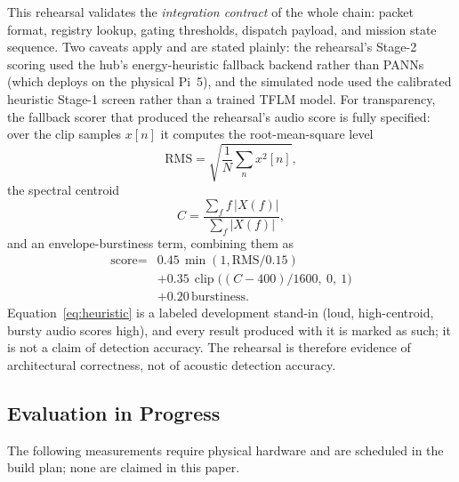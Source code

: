 \documentclass[journal]{IEEEtran}
\begin{document}
This rehearsal validates the \emph{integration contract} of the whole chain:
packet format, registry lookup, gating thresholds, dispatch payload, and
mission state sequence. Two caveats apply and are stated plainly: the
rehearsal's Stage-2 scoring used the hub's energy-heuristic fallback backend
rather than PANNs (which deploys on the physical Pi~5), and the simulated
node used the calibrated heuristic Stage-1 screen rather than a trained TFLM
model. For transparency, the fallback scorer that produced the rehearsal's
audio score is fully specified: over the clip samples $x[n]$ it computes the
root-mean-square level
\begin{equation}
\label{eq:rms}
\mathrm{RMS} = \sqrt{\frac{1}{N} \sum_{n} x^{2}[n]},
\end{equation}
the spectral centroid
\begin{equation}
\label{eq:centroid}
C = \frac{\sum_{f} f\,|X(f)|}{\sum_{f} |X(f)|},
\end{equation}
and an envelope-burstiness term, combining them as
\begin{equation}
\label{eq:heuristic}
\begin{split}
\text{score} = {}& 0.45\,\min(1, \mathrm{RMS}/0.15) \\
& + 0.35\,\operatorname{clip}\!\bigl((C - 400)/1600,\ 0,\ 1\bigr) \\
& + 0.20\,\text{burstiness}.
\end{split}
\end{equation}
Equation~\eqref{eq:heuristic} is a labeled development stand-in (loud,
high-centroid, bursty audio scores high), and every result produced with it
is marked as such; it is not a claim of detection accuracy. The rehearsal is
therefore evidence of architectural correctness, not of acoustic detection
accuracy.

\subsection{Evaluation in Progress}
\label{sec:pending}

The following measurements require physical hardware and are scheduled in
the build plan; none are claimed in this paper.
\end{document}
